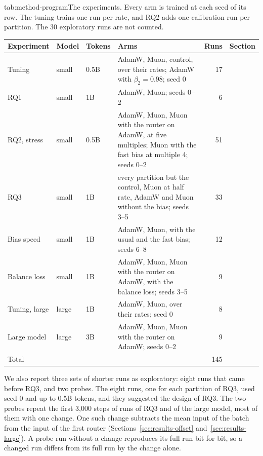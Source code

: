 \begin{table}[The experiments]{tab:method-program}{The experiments. Every arm is trained at each seed of its row. The tuning trains one run per rate, and RQ2 adds one calibration run per partition. The 30 exploratory runs are not counted.}
  \small
  \setlength{\tabcolsep}{4pt}
  \begin{tabular}{@{}lll>{\raggedright\arraybackslash}p{9cm}rl@{}}
    \toprule
    Experiment    & Model & Tokens & Arms                                                   & Runs & Section                        \\
    \midrule
    Tuning        & small & 0.5B   & AdamW, Muon, control, over their rates; AdamW with $\beta_2 = 0.98$; seed 0 & 17   & {sec:method-tuning}  \\
    RQ1           & small & 1B     & AdamW, Muon; seeds 0--2                                & 6    & {sec:results-rq1}    \\
    RQ2, stress   & small & 0.5B   & AdamW, Muon, Muon with the router on AdamW, at five multiples; Muon with the fast bias at multiple 4; seeds 0--2 & 51 & {sec:results-rq2}    \\
    RQ3           & small & 1B     & every partition but the control, Muon at half rate, AdamW and Muon without the bias; seeds 3--5 & 33 & {sec:results-rq3} \\
    Bias speed    & small & 1B     & AdamW, Muon, with the usual and the fast bias; seeds 6--8 & 12 & {sec:results-bias-speed} \\
    Balance loss  & small & 1B     & AdamW, Muon, Muon with the router on AdamW, with the balance loss; seeds 3--5 & 9 & {sec:results-balance-loss} \\
    Tuning, large & large & 1B     & AdamW, Muon, over their rates; seed 0                 & 8    & {sec:method-tuning}  \\
    Large model   & large & 3B     & AdamW, Muon, Muon with the router on AdamW; seeds 0--2                 & 9    & {sec:results-large}  \\
    \midrule
    Total         &       &        &                                                        & 145  &                                \\
    \bottomrule
  \end{tabular}
\end{table}

We also report three sets of shorter runs as exploratory: eight runs that came before RQ3, and two probes. The eight runs, one for each partition of RQ3, used seed 0 and up to 0.5B tokens, and they suggested the design of RQ3. The two probes repeat the first 3,000 steps of runs of RQ3 and of the large model, most of them with one change. One such change subtracts the mean input of the batch from the input of the first router (Sections~\ref{sec:results-offset} and~\ref{sec:results-large}). A probe run without a change reproduces its full run bit for bit, so a changed run differs from its full run by the change alone.

